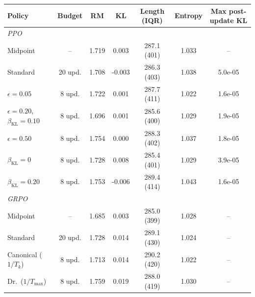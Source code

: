 \begin{tabular}{l c c c c c c}
  \toprule
  \textbf{Policy} & \textbf{Budget} & \textbf{RM} & \textbf{KL} & \textbf{Length (IQR)} & \textbf{Entropy} & \textbf{Max post-update KL} \\
  \midrule
    \multicolumn{7}{l}{\textit{PPO}} \\
    Midpoint & -- & 1.719 & 0.003 & 287.1 (401) & 1.033 & -- \\
    Standard & 20 upd. & 1.708 & -0.003 & 286.3 (403) & 1.038 & 5.0e-05 \\
    $\epsilon = 0.05$ & 8 upd. & 1.722 & 0.001 & 287.7 (411) & 1.022 & 1.6e-05 \\
    $\epsilon = 0.20$, $\beta_{\text{KL}} = 0.10$ & 8 upd. & 1.696 & 0.001 & 285.6 (400) & 1.029 & 1.9e-05 \\
    $\epsilon = 0.50$ & 8 upd. & 1.754 & 0.000 & 288.3 (402) & 1.037 & 1.8e-05 \\
    $\beta_{\text{KL}} = 0$ & 8 upd. & 1.728 & 0.008 & 285.4 (401) & 1.029 & 3.9e-05 \\
    $\beta_{\text{KL}} = 0.20$ & 8 upd. & 1.753 & -0.006 & 289.4 (414) & 1.043 & 1.6e-05 \\
    \midrule
    \multicolumn{7}{l}{\textit{GRPO}} \\
    Midpoint & -- & 1.685 & 0.003 & 285.0 (399) & 1.028 & -- \\
    Standard & 20 upd. & 1.728 & 0.014 & 289.1 (430) & 1.024 & -- \\
    Canonical ($1/T_k$) & 8 upd. & 1.713 & 0.014 & 290.2 (420) & 1.022 & -- \\
    Dr.\ ($1/T_{\max}$) & 8 upd. & 1.759 & 0.019 & 288.0 (419) & 1.030 & -- \\
  \bottomrule
\end{tabular}
